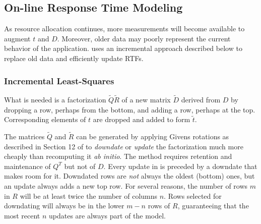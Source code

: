 \subsection{On-line Response Time Modeling}
As resource allocation continues, more measurements will become available to augment $t$ and $D$.
Moreover, older data may poorly represent the current behavior of the application.
\pacora uses an incremental approach described below to replace old data and efficiently update RTFs.

\subsubsection*{Incremental Least-Squares}
What is needed is a factorization $\tilde{Q}\tilde{R}$ of a new matrix $\tilde{D}$
derived from $D$ by dropping a row, perhaps from the bottom,
and adding a row, perhaps at the top.
Corresponding elements of $t$ are dropped and added to form $\tilde{t}$.

The matrices $\tilde{Q}$ and $\tilde{R}$ can be generated by applying Givens rotations
as described in Section 12 of \cite{GoVL} to \emph{downdate} or \emph{update} the factorization
much more cheaply than recomputing it \emph{ab initio}.
The method requires retention and maintenance of $Q^T$ but not of $D$.
Every update in \pacora is preceded by a downdate that makes room for it.
Downdated rows are \emph{not} always the oldest (bottom) ones, but
an update always adds a new top row.
For several reasons, the number of rows $m$ in $R$
will be at least twice the number of columns $n$.
Rows selected for downdating will always be in the lower $m - n$ rows of $R$,
guaranteeing that the most recent $n$ updates are always part of the model.


